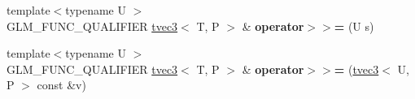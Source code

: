 \begin{DoxyCompactItemize}
\item 
{\footnotesize template$<$typename U $>$ }\\G\+L\+M\+\_\+\+F\+U\+N\+C\+\_\+\+Q\+U\+A\+L\+I\+F\+I\+ER \hyperlink{structglm_1_1detail_1_1tvec3}{tvec3}$<$ T, P $>$ \& {\bfseries operator$>$$>$=} (U s)\hypertarget{structglm_1_1detail_1_1tvec3_ac6bc89e208ccf9b351c327559c9a630c}{}\label{structglm_1_1detail_1_1tvec3_ac6bc89e208ccf9b351c327559c9a630c}

\item 
{\footnotesize template$<$typename U $>$ }\\G\+L\+M\+\_\+\+F\+U\+N\+C\+\_\+\+Q\+U\+A\+L\+I\+F\+I\+ER \hyperlink{structglm_1_1detail_1_1tvec3}{tvec3}$<$ T, P $>$ \& {\bfseries operator$>$$>$=} (\hyperlink{structglm_1_1detail_1_1tvec3}{tvec3}$<$ U, P $>$ const \&v)\hypertarget{structglm_1_1detail_1_1tvec3_a20f86c2c8feefe660c7968878b794ac4}{}\label{structglm_1_1detail_1_1tvec3_a20f86c2c8feefe660c7968878b794ac4}

\end{DoxyCompactItemize}
